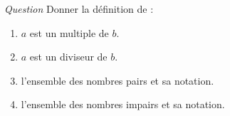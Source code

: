 \textit{Question}
Donner la définition de :
\begin{enumerate}
	\item $a$ est un multiple de $b$.
	\item $a$ est un diviseur de $b$.
	\item l'ensemble des nombres pairs et sa notation.
	\item l'ensemble des nombres impairs et sa notation.
\end{enumerate}
